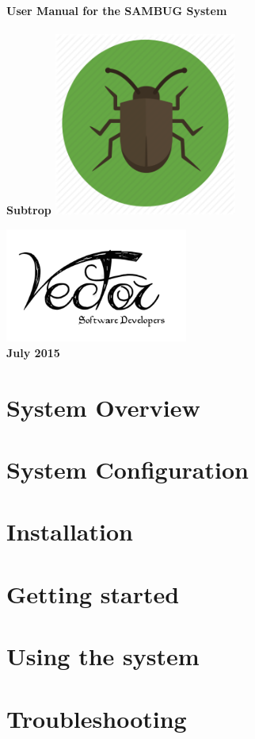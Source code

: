 \documentclass[11pt,a4paper,titlepage]{article}
\begin{document}

\begin{titlepage}
    \centering
    \vfill
    {\bfseries\Huge
         User Manual for the SAMBUG System\\
      \hfill\\
         \Large Subtrop
        \vskip2cm
        \includegraphics[width=6cm]{sambug} \\

    }        
    
    \vfill
    \includegraphics[width=6cm]{logo} \\
    \textbf{July 2015}
    \vfill
\end{titlepage}
	

\tableofcontents

\pagebreak

\section{System Overview}

\section{System Configuration}

\section{Installation}
		
\section{Getting started}

\section{Using the system}

\section{Troubleshooting}
\end{document}
